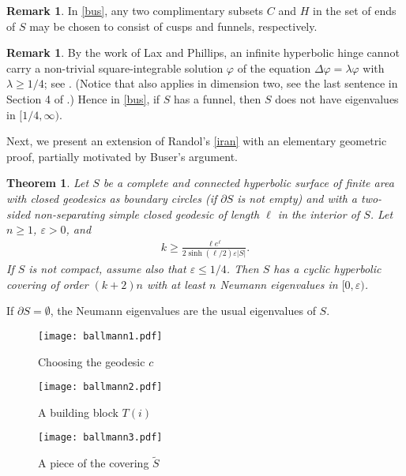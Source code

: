 \documentclass[a4paper,11pt]{amsart}
\numberwithin{equation}{section}
\newtheorem{thm}[equation]{Theorem}
\theoremstyle{definition}
\newtheorem{rem}[equation]{Remark}
\def\ve{\varepsilon}
\def\vf{\varphi}
\begin{document}
\begin{rem}\label{ends}
In \cref{bus}, any two complimentary subsets $C$ and $H$ in the set of ends of $S$ may be chosen to consist of cusps and funnels, respectively. 
\end{rem}

\begin{rem}\label{laxp}
By the work of Lax and Phillips, an infinite hyperbolic hinge cannot carry a non-trivial square-integrable solution $\vf$ of the equation $\Delta\vf=\lambda\vf$ with $\lambda\ge1/4$; see \cite[Theorem 4.8]{LP}.
(Notice that \cite[Theorem 4.8]{LP} also applies in dimension two, see the last sentence in Section 4 of \cite{LP}.)
Hence in \cref{bus}, if $S$ has a funnel, then $S$ does not have eigenvalues in $[1/4,\infty)$.
\end{rem}

Next, we present an extension of Randol's \cref{iran} with an elementary geometric proof, partially motivated by Buser's argument.

\begin{thm}\label{ran}
Let $S$ be a complete and connected hyperbolic surface of finite area with closed geodesics as boundary circles (if $\partial S$ is not empty) and with a two-sided non-separating simple closed geodesic of length $\ell$ in the interior of $S$.
Let $n\ge1$, $\ve>0$, and
\begin{align*}
  k \ge \frac{\ell e^{\ell}}{2\sinh(\ell/2)\ve|S|}.
\end{align*}
If $S$ is not compact, assume also that $\ve\le1/4$.
Then $S$ has a cyclic hyperbolic covering of order $(k+2)n$ with at least $n$ Neumann eigenvalues in $[0,\ve)$.
\end{thm}

If $\partial S=\emptyset$, the Neumann eigenvalues are the usual eigenvalues of $S$.

\begin{figure}
\texttt{[image: ballmann1.pdf]}
\caption{Choosing the geodesic $c$}\label{figu_init}
\end{figure}

\begin{figure}
\texttt{[image: ballmann2.pdf]}
\caption{A building block $T(i)$}\label{figu_build}
\end{figure}

\begin{figure}
\texttt{[image: ballmann3.pdf]}
\caption{A piece of the covering $\tilde S$}\label{figu_cov}
\end{figure}
\end{document}
